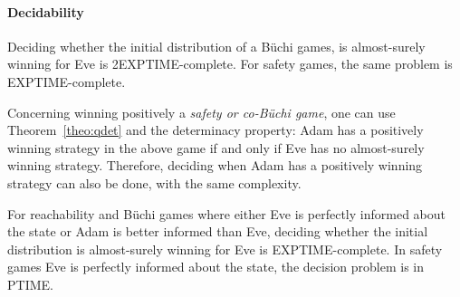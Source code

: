 \paragraph{Decidability}
\newcommand{\EXPTIME}{{\sc EXPTIME}}
\newcommand{\PTIME}{{\sc PTIME}}

\begin{theorem}
\label{th:main}
Deciding whether the initial distribution of a B\"uchi games,
is almost-surely winning for Eve is
2\EXPTIME-complete.
For safety games, the same problem is \EXPTIME-complete.
\end{theorem}

Concerning winning positively a {\em safety or co-B\"uchi game}, one
can use Theorem~\ref{theo:qdet} and the determinacy property: Adam
has a positively winning strategy in the above game if and only if
Eve has no almost-surely winning strategy. Therefore, deciding
when Adam has a positively winning strategy can also be done, with
the same complexity.


\begin{theorem}
\label{th:main2}
For reachability and B\"uchi games where either Eve is perfectly informed about the state
or Adam is
better informed than Eve, deciding whether the initial distribution is
almost-surely winning for Eve is
\EXPTIME-complete.
In safety games
Eve is perfectly
informed {about the state}, the decision problem is in \PTIME.
\end{theorem}


